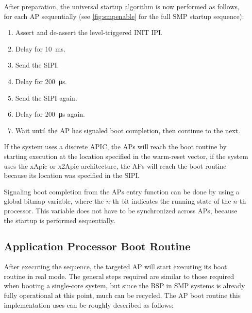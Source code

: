 After preparation, the universal startup algorithm is now performed as follows, for each AP sequentially (see \autoref{fig:smpenable} for the full SMP startup sequence):

\begin{enumerate}
  \item Assert and de-assert the level-triggered INIT IPI\@.
  \item Delay for \SI{10}{\milli\second}.
  \item Send the SIPI\@.
  \item Delay for \SI{200}{\micro\second}.
  \item Send the SIPI again.
  \item Delay for \SI{200}{\micro\second} again.
  \item Wait until the AP has signaled boot completion, then continue to the next.
\end{enumerate}

If the system uses a discrete APIC, the APs will reach the boot routine by starting execution at the location specified in the warm-reset vector, if the system uses the xApic or x2Apic architecture, the APs will reach the boot routine because its location was specified in the SIPI\@.

Signaling boot completion from the APs entry function can be done by using a global bitmap variable, where the \(n\)-th bit indicates the running state of the \(n\)-th processor.
This variable does not have to be synchronized across APs, because the startup is performed sequentially.

\subsection{Application Processor Boot Routine}
\label{subsec:apboot}

After executing the  sequence, the targeted AP will start executing its boot routine in real mode.
The general steps required are similar to those required when booting a single-core system, but since the BSP in SMP systems is already fully operational at this point, much can be recycled.
The AP boot routine this implementation uses can be roughly described as follows:

